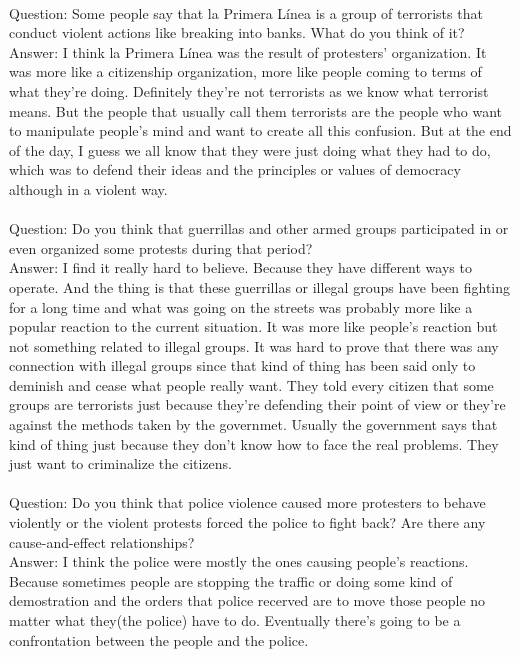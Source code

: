\documentclass{phyasgn}\usepackage{nag}
\begin{document}
\\
Question: Some people say that la Primera Línea is a group of terrorists that conduct violent actions like breaking into banks. What do you think of it?\\
Answer: I think la Primera Línea was the result of protesters’ organization. It was more like a citizenship organization, more like people coming to terms of what they’re doing. Definitely they’re not terrorists as we know what terrorist means. But the people that usually call them terrorists are the people who want to manipulate people’s mind and want to create all this confusion. But at the end of the day, I guess we all know that they were just doing what they had to do, which was to defend their ideas and the principles or values of democracy although in a violent way.\\
\\
Question: Do you think that guerrillas and other armed groups participated in or even organized some protests during that period?\\
Answer: I find it really hard to believe. Because they have different ways to operate. And the thing is that these guerrillas or illegal groups have been fighting for a long time and what was going on the streets was probably more like a popular reaction to the current situation. It was more like people’s reaction but not something related to illegal groups. It was hard to prove that there was any connection with illegal groups since that kind of thing has been said only to deminish and cease what people really want. They told every citizen that some groups are terrorists just because they’re defending their point of view or they’re against the methods taken by the governmet. Usually the government says that kind of thing just because they don’t know how to face the real problems. They just want to criminalize the citizens.\\
\\
Question: Do you think that police violence caused more protesters to behave violently or the violent protests forced the police to fight back? Are there any cause-and-effect relationships?\\
Answer: I think the police were mostly the ones causing people’s reactions. Because sometimes people are stopping the traffic or doing some kind of demostration and the orders that police recerved are to move those people no matter what they(the police) have to do. Eventually there’s going to be a confrontation between the people and the police. \\
\end{document}
